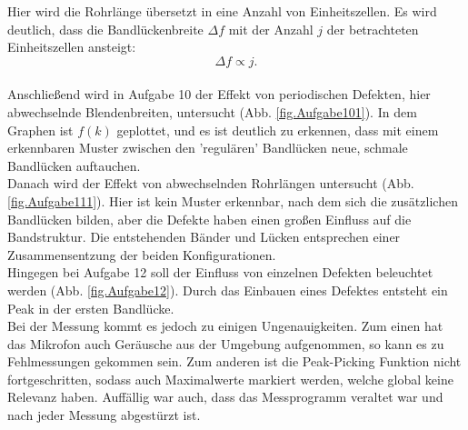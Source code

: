 Hier wird die Rohrlänge übersetzt in eine Anzahl von Einheitszellen.
Es wird deutlich, dass die Bandlückenbreite $\Delta f$ mit der Anzahl $j$ der betrachteten Einheitszellen ansteigt:
\begin{equation*}
  \Delta f \propto j.
\end{equation*}
\\Anschließend wird in Aufgabe 10 der Effekt von periodischen Defekten, hier abwechselnde Blendenbreiten, untersucht (Abb. \ref{fig.Aufgabe101}).
In dem Graphen ist $f(k)$ geplottet, und es ist deutlich zu erkennen, dass mit einem erkennbaren Muster zwischen den 'regulären' Bandlücken neue, schmale Bandlücken auftauchen.
\\Danach wird der Effekt von abwechselnden Rohrlängen untersucht (Abb. \ref{fig.Aufgabe111}).
Hier ist kein Muster erkennbar, nach dem sich die zusätzlichen Bandlücken bilden, aber die Defekte haben einen großen Einfluss auf die Bandstruktur.
Die entstehenden Bänder und Lücken entsprechen einer Zusammensentzung der beiden Konfigurationen.
\\Hingegen bei Aufgabe 12 soll der Einfluss von einzelnen Defekten beleuchtet werden (Abb. \ref{fig.Aufgabe12}).
Durch das Einbauen eines Defektes entsteht ein Peak in der ersten Bandlücke.
\\Bei der Messung kommt es jedoch zu einigen Ungenauigkeiten.
Zum einen hat das Mikrofon auch Geräusche aus der Umgebung aufgenommen, so kann es zu Fehlmessungen gekommen sein.
Zum anderen ist die Peak-Picking Funktion nicht fortgeschritten, sodass auch Maximalwerte markiert werden, welche global keine Relevanz haben.
Auffällig war auch, dass das Messprogramm veraltet war und nach jeder Messung abgestürzt ist.
